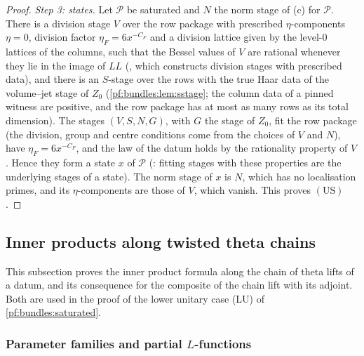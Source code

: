 \begin{proof}
\emph{Step 3: states.} Let $\mathcal P$ be saturated and $N$ the norm stage of (c) for $\mathcal P$. There is a division stage $V$ over the
row package with prescribed $\eta$-components $\eta=0$, division factor $\eta_F=6x^{-C_F}$ and a division lattice given by the level-$0$
lattices of the columns, such that the Bessel values of $V$ are rational whenever they lie in the image of $\mathit{LL}$
(, which constructs division stages with prescribed data), and there is an
$S$-stage over the rows with the true Haar data of the volume--jet stage of $Z_0$ (\cref{pf:bundles:lem:sstage}; the column data of a
pinned witness are positive, and the row package has at most as many rows as its total dimension). The
stages $(V,S,N,G)$, with $G$ the stage of $Z_0$, fit the row package (the division, group and centre conditions come from the choices of $V$
and $N$), have $\eta_F=6x^{-C_F}$, and the law of the datum holds by the rationality property of $V$. Hence they form a state $x$ of
$\mathcal P$ (: fitting stages with these properties are the
underlying stages of a state). The norm stage of $x$ is $N$, which has no localisation primes, and its $\eta$-components are those of $V$,
which vanish. This proves $(\mathrm{US})$.
\end{proof}

\subsection{Inner products along twisted theta chains}\label{pf:bundles:chains}

This subsection proves the inner product formula along the chain of theta lifts of a datum, and its consequence for the composite of the
chain lift with its adjoint. Both are used in the proof of the lower unitary case (LU) of \cref{pf:bundles:saturated}.

\subsubsection{Parameter families and partial $L$-functions}

